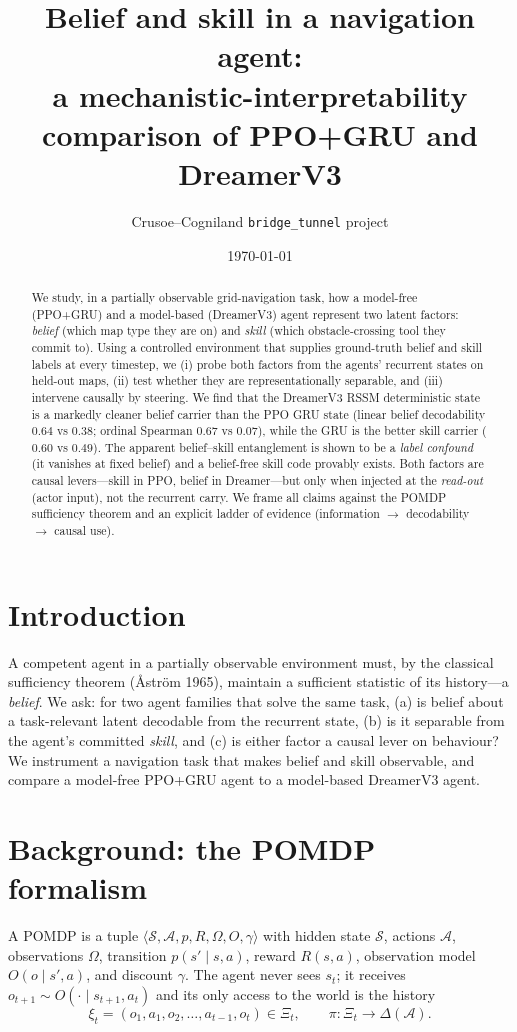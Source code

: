 \documentclass[11pt]{article}
\title{\textbf{Belief and skill in a navigation agent:\\
a mechanistic-interpretability comparison of PPO+GRU and DreamerV3}}
\author{Crusoe--Cogniland \texttt{bridge\_tunnel} project}
\date{\today}
\newcommand{\Sset}{\mathcal{S}}
\newcommand{\Aset}{\mathcal{A}}
\begin{document}
\maketitle
\begin{abstract}
We study, in a partially observable grid-navigation task, how a model-free
(PPO+GRU) and a model-based (DreamerV3) agent represent two latent factors:
\emph{belief} (which map type they are on) and \emph{skill} (which obstacle-crossing
tool they commit to). Using a controlled environment that supplies ground-truth
belief and skill labels at every timestep, we (i) probe both factors from the
agents' recurrent states on held-out maps, (ii) test whether they are
representationally separable, and (iii) intervene causally by steering. We find
that the DreamerV3 RSSM deterministic state is a markedly cleaner belief carrier
than the PPO GRU state (linear belief decodability $0.64$ vs $0.38$; ordinal
Spearman $0.67$ vs $0.07$), while the GRU is the better skill carrier ($0.60$ vs
$0.49$). The apparent belief--skill entanglement is shown to be a \emph{label
confound} (it vanishes at fixed belief) and a belief-free skill code provably
exists. Both factors are causal levers---skill in PPO, belief in Dreamer---but only
when injected at the \emph{read-out} (actor input), not the recurrent carry. We
frame all claims against the POMDP sufficiency theorem and an explicit
ladder of evidence (information $\to$ decodability $\to$ causal use).
\end{abstract}

\section{Introduction}
A competent agent in a partially observable environment must, by the
classical sufficiency theorem (\AA str\"om 1965), maintain a sufficient statistic
of its history---a \emph{belief}. We ask: for two agent families that solve the
same task, (a) is belief about a task-relevant latent decodable from the
recurrent state, (b) is it separable from the agent's committed \emph{skill}, and
(c) is either factor a causal lever on behaviour? We instrument a navigation task
that makes belief and skill observable, and compare a model-free PPO+GRU agent to
a model-based DreamerV3 agent.

\section{Background: the POMDP formalism}
A POMDP is a tuple $\langle\Sset,\Aset,p,R,\Omega,O,\gamma\rangle$ with hidden state
$\Sset$, actions $\Aset$, observations $\Omega$, transition $p(s'\mid s,a)$, reward
$R(s,a)$, observation model $O(o\mid s',a)$, and discount $\gamma$. The agent never
sees $s_t$; it receives $o_{t+1}\sim O(\cdot\mid s_{t+1},a_t)$ and its only access to
the world is the history
\begin{equation}
\xi_t=(o_1,a_1,o_2,\dots,a_{t-1},o_t)\in\Xi_t,\qquad
\pi:\Xi_t\to\Delta(\Aset).
\end{equation}
\end{document}

